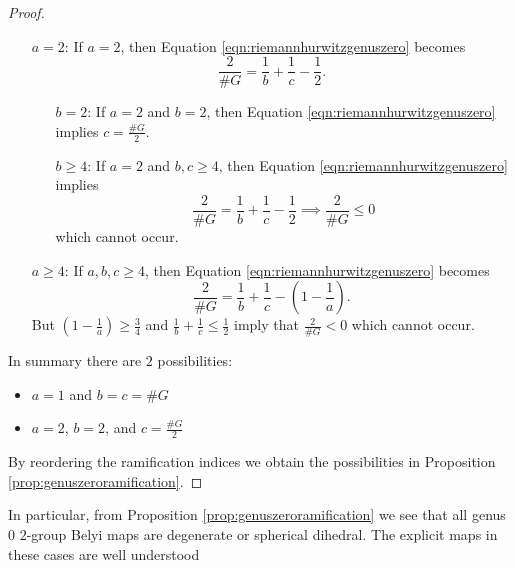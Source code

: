 \documentclass{dcthesis}
\theoremstyle{definition}
\theoremstyle{remark}
\numberwithin{equation}{section}
\numberwithin{figure}{section}
\begin{document}
{{\begin{proof}
\begin{itemize}
\begin{itemize}
\[                \implies
                \#G\left(2^{n-m}+1\right) = 2^{n+1}.
              \]
              Since $\#G$ is a power of $2$, we must have
              $2^{n-m}+1\in\{1,2\}$ which only occurs when $m=n$.
              Therefore $m=n$ which implies $b=c=\#G$.
          \end{itemize}
        \item[\underline{$a=2$}:]
          If $a=2$, then
          Equation \ref{eqn:riemannhurwitzgenuszero} becomes
          \[
            \frac{2}{\#G} = \frac{1}{b}+\frac{1}{c}-\frac{1}{2}.
          \]
          \begin{itemize}
            \item[\underline{$b=2$}:]
              If $a=2$ and $b=2$, then
              Equation \ref{eqn:riemannhurwitzgenuszero} implies
              $c=\frac{\#G}{2}$.
            \item[\underline{$b\ge 4$}:]
              If $a=2$ and $b,c\geq 4$, then
              Equation \ref{eqn:riemannhurwitzgenuszero} implies
              \[
                \frac{2}{\#G} = \frac{1}{b}+\frac{1}{c}-\frac{1}{2}
                \implies
                \frac{2}{\#G}\le 0
              \]
              which cannot occur.
          \end{itemize}
        \item[\underline{$a\geq 4$}:]
          If $a,b,c\geq 4$, then
          Equation \ref{eqn:riemannhurwitzgenuszero} becomes
          \[
            \frac{2}{\#G} = \frac{1}{b}+\frac{1}{c} - \left(1-\frac{1}{a}\right).
          \]
          But
          $\left(1-\frac{1}{a}\right)\ge\frac{3}{4}$
          and
          $\frac{1}{b}+\frac{1}{c}\le\frac{1}{2}$
          imply that
          $\frac{2}{\#G}<0$
          which cannot occur.
      \end{itemize}
      In summary there are $2$ possibilities:
      \begin{itemize}
        \item $a=1$ and $b=c=\#G$
        \item $a=2$, $b=2$, and $c=\frac{\#G}{2}$
      \end{itemize}
      By reordering the ramification indices
      we obtain the possibilities in Proposition \ref{prop:genuszeroramification}.
    \end{proof}
    In particular,
    from
    Proposition \ref{prop:genuszeroramification}
    we see that all genus $0$ $2$-group Belyi maps
    are degenerate or spherical dihedral.
    The explicit maps in these cases are well understood
}}
\end{document}
